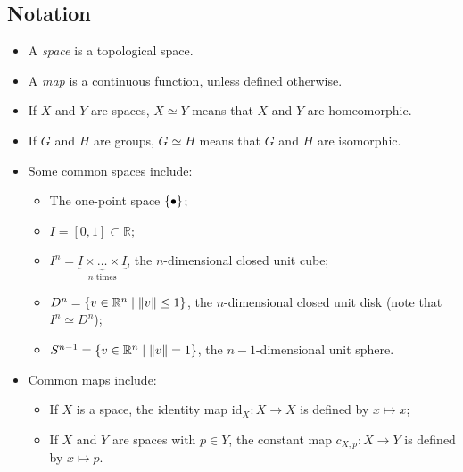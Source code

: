 \subsection{Notation}
\begin{itemize}
	\item A \emph{space} is a topological space.
	\item A \emph{map} is a continuous function, unless defined otherwise.
	\item If \( X \) and \( Y \) are spaces, \( X \simeq Y \) means that \( X \) and \( Y \) are homeomorphic.
	\item If \( G \) and \( H \) are groups, \( G \simeq H \) means that \( G \) and \( H \) are isomorphic.
	\item Some common spaces include:
	\begin{itemize}
		\item The one-point space \( \qty{\bullet} \);
		\item \( I = [0,1] \subset \mathbb R \);
		\item \( I^n = \underbrace{I \times \dots \times I}_{n\text{ times}} \), the \( n \)-dimensional closed unit cube;
		\item \( D^n = \qty{v \in \mathbb R^n \mid \norm{v} \leq 1} \), the \( n \)-dimensional closed unit disk (note that \( I^n \simeq D^n \));
		\item \( S^{n-1} = \qty{v \in \mathbb R^n \mid \norm{v} = 1} \), the \( n-1 \)-dimensional unit sphere.
	\end{itemize}
	\item Common maps include:
	\begin{itemize}
		\item If \( X \) is a space, the identity map \( \mathrm{id}_X \colon X \to X \) is defined by \( x \mapsto x \);
		\item If \( X \) and \( Y \) are spaces with \( p \in Y \), the constant map \( c_{X,p} \colon X \to Y \) is defined by \( x \mapsto p \).
	\end{itemize}
\end{itemize}
